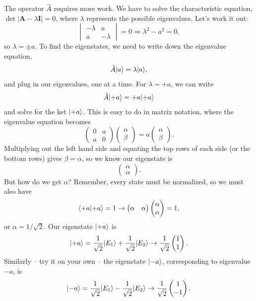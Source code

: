 \begin{example}
The operator $\hat{A}$ requires more work.  We have to solve the characteristic equation, $\det |\mathbf{A} - \lambda \mathbf{I} | = 0$, where $\lambda$ represents the possible eigenvalues.  Let's work it out:
\[
\begin{vmatrix} -\lambda & a \\ a & -\lambda \end{vmatrix} = 0 \Rightarrow \lambda^2 - a^2 = 0,
\]
so $\lambda = \pm a$.  To find the eigenstates, we need to write down the eigenvalue equation,
\[
\hat{A} | a \rangle = \lambda | a \rangle,
\]
and plug in our eigenvalues, one at a time.  For $\lambda = +a$, we can write
\[
\hat{A} | {+}a \rangle = +a | {+}a \rangle
\]
and solve for the ket $| {+}a \rangle$.  This is easy to do in matrix notation, where the eigenvalue equation becomes
\[
\begin{pmatrix}
0 & a \\ a & 0
\end{pmatrix} 
\begin{pmatrix}
\alpha \\ \beta
\end{pmatrix} 
= a \begin{pmatrix}
\alpha \\ \beta
\end{pmatrix}.
\]
Multiplying out the left hand side and equating the top rows of each side (or the bottom rows) gives $\beta = \alpha$, so we know our eigenstate is 
\[
\begin{pmatrix}
\alpha \\ \alpha
\end{pmatrix}.
\]
But how do we get $\alpha$?  Remember, every state must be normalized, so we must also have
\[
\langle {+}a | {+}a \rangle = 1 \to \begin{pmatrix}
\alpha & \alpha
\end{pmatrix}\begin{pmatrix}
\alpha \\ \alpha
\end{pmatrix} = 1,
\]
or $\alpha = 1/\sqrt{2}$.  Our eigenstate $| {+}a \rangle$ is
\[
| {+}a \rangle = \frac{1}{\sqrt{2}} | E_1 \rangle + \frac{1}{\sqrt{2}} | E_2 \rangle \to \frac{1}{\sqrt{2}} \begin{pmatrix}
1 \\ 1
\end{pmatrix}.
\]
Similarly -- try it on your own -- the eigenstate $| {-}a \rangle$, corresponding to eigenvalue $-a$, is
\[
| {-}a \rangle = \frac{1}{\sqrt{2}} | E_1 \rangle - \frac{1}{\sqrt{2}} | E_2 \rangle \to \frac{1}{\sqrt{2}} \begin{pmatrix}
1 \\ -1
\end{pmatrix}.
\]


\end{example}

